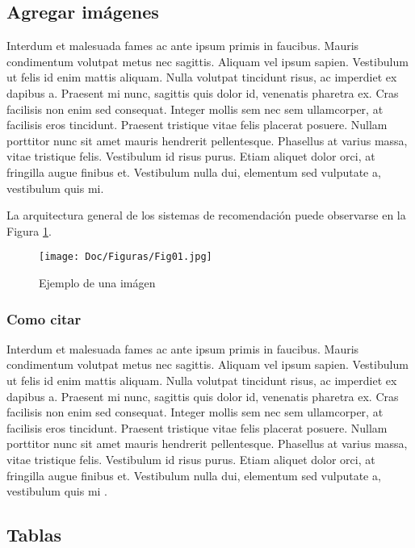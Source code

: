 \documentclass[a4paper, 11pt]{article}
\begin{document}
\subsection{Agregar imágenes}
Interdum et malesuada fames ac ante ipsum primis in faucibus. Mauris condimentum volutpat metus nec sagittis. Aliquam vel ipsum sapien. Vestibulum ut felis id enim mattis aliquam. Nulla volutpat tincidunt risus, ac imperdiet ex dapibus a. Praesent mi nunc, sagittis quis dolor id, venenatis pharetra ex. Cras facilisis non enim sed consequat. Integer mollis sem nec sem ullamcorper, at facilisis eros tincidunt. Praesent tristique vitae felis placerat posuere. Nullam porttitor nunc sit amet mauris hendrerit pellentesque. Phasellus at varius massa, vitae tristique felis. Vestibulum id risus purus. Etiam aliquet dolor orci, at fringilla augue finibus et. Vestibulum nulla dui, elementum sed vulputate a, vestibulum quis mi.


La arquitectura general de los sistemas de recomendación puede observarse en la Figura \ref{Figura01}.


\begin{figure}[H]
\centering
\texttt{[image: Doc/Figuras/Fig01.jpg]}
\caption{Ejemplo de una imágen}
\label{Figura01}
\end{figure}
 
\subsubsection{Como citar}
Interdum et malesuada fames ac ante ipsum primis in faucibus. Mauris condimentum volutpat metus nec sagittis. Aliquam vel ipsum sapien.
Vestibulum ut felis id enim mattis aliquam. Nulla volutpat tincidunt risus, ac imperdiet ex dapibus a. Praesent mi nunc, sagittis quis dolor id, venenatis pharetra ex. 
Cras facilisis non enim sed consequat. Integer mollis sem nec sem ullamcorper, at facilisis eros tincidunt. Praesent tristique vitae felis placerat posuere. Nullam porttitor nunc sit amet mauris hendrerit pellentesque. 
Phasellus at varius massa, vitae tristique felis. Vestibulum id risus purus. Etiam aliquet dolor orci, at fringilla augue finibus et. Vestibulum nulla dui, elementum sed vulputate a, vestibulum quis mi \cite{niklas_python-agentspeak_2017}.

\subsection{Tablas}
\end{document}

